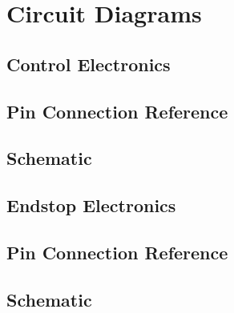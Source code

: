\chapter{Circuit Diagrams}
	
	\section{Control Electronics}
		
		\section{Pin Connection Reference}
		
		\section{Schematic}
	
	\section{Endstop Electronics}
		
		\section{Pin Connection Reference}
		
		\section{Schematic}
